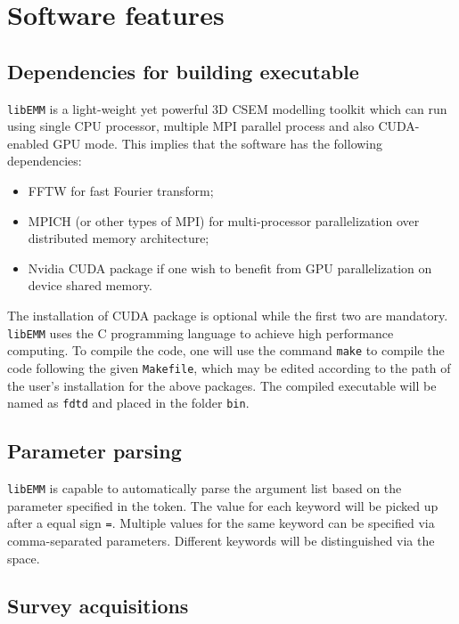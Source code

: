 \documentclass[a4paper,10pt]{article}
\begin{document}
\section{Software features}


\subsection{Dependencies for building executable}

\verb|libEMM| is a light-weight yet powerful 3D CSEM modelling toolkit which can run using single CPU processor, multiple MPI parallel process and also CUDA-enabled GPU mode. This implies that the software has the following dependencies:
\begin{itemize}
\item FFTW for fast Fourier transform;
\item MPICH (or other types of MPI) for multi-processor parallelization over distributed memory architecture;
\item Nvidia CUDA package if one wish to benefit from GPU parallelization on device shared memory.
\end{itemize}
The installation of CUDA package is optional while the first two are mandatory. \verb|libEMM| uses the C programming language to achieve high performance computing. To compile the code, one will use the command \verb|make| to compile the code following the given \verb|Makefile|, which may be edited according to the path of the user's installation for the above packages. The compiled executable will be named as \verb|fdtd| and placed in the folder \verb|bin|.

\subsection{Parameter parsing}

\verb|libEMM| is capable to automatically parse the argument list based on the parameter specified in the token. The value for each keyword will be picked up after a equal sign \verb|=|. Multiple values for the same keyword can be specified via comma-separated parameters. Different keywords will be distinguished via the space.


\subsection{Survey acquisitions}
\end{document}
